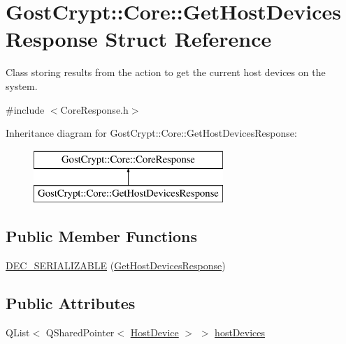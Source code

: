 \hypertarget{struct_gost_crypt_1_1_core_1_1_get_host_devices_response}{}\section{Gost\+Crypt\+:\+:Core\+:\+:Get\+Host\+Devices\+Response Struct Reference}
\label{struct_gost_crypt_1_1_core_1_1_get_host_devices_response}


Class storing results from the action to get the current host devices on the system.  




{\ttfamily \#include $<$Core\+Response.\+h$>$}

Inheritance diagram for Gost\+Crypt\+:\+:Core\+:\+:Get\+Host\+Devices\+Response\+:\begin{figure}[H]
\begin{center}
\leavevmode
\includegraphics[height=2.000000cm]{struct_gost_crypt_1_1_core_1_1_get_host_devices_response}
\end{center}
\end{figure}
\subsection*{Public Member Functions}
\begin{DoxyCompactItemize}
\item 
\hyperlink{struct_gost_crypt_1_1_core_1_1_get_host_devices_response_a3af2e69eca164057b2146d204d3497e1}{D\+E\+C\+\_\+\+S\+E\+R\+I\+A\+L\+I\+Z\+A\+B\+LE} (\hyperlink{struct_gost_crypt_1_1_core_1_1_get_host_devices_response}{Get\+Host\+Devices\+Response})
\end{DoxyCompactItemize}
\subsection*{Public Attributes}
\begin{DoxyCompactItemize}
\item 
Q\+List$<$ Q\+Shared\+Pointer$<$ \hyperlink{struct_gost_crypt_1_1_core_1_1_host_device}{Host\+Device} $>$ $>$ \hyperlink{struct_gost_crypt_1_1_core_1_1_get_host_devices_response_a6b184e616463da031c114324465a90ff}{host\+Devices}
\end{DoxyCompactItemize}


